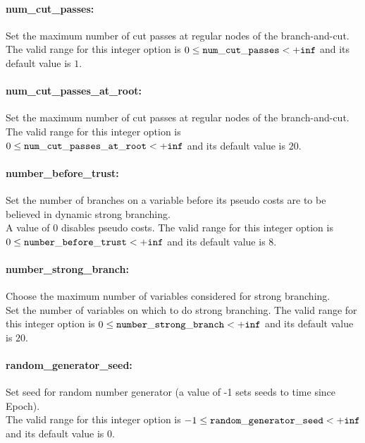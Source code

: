 \paragraph{num\_cut\_passes:}\label{sec:num_cut_passes} Set the maximum number of cut passes at regular nodes of the branch-and-cut. $\;$ \\
 The valid range for this integer option is
$0 \le {\tt num\_cut\_passes } <  {\tt +inf}$
and its default value is $1$.


\paragraph{num\_cut\_passes\_at\_root:}\label{sec:num_cut_passes_at_root} Set the maximum number of cut passes at regular nodes of the branch-and-cut. $\;$ \\
 The valid range for this integer option is
$0 \le {\tt num\_cut\_passes\_at\_root } <  {\tt +inf}$
and its default value is $20$.


\paragraph{number\_before\_trust:}\label{sec:number_before_trust} Set the number of branches on a variable before its pseudo costs are to be believed in dynamic strong branching. $\;$ \\
 A value of 0 disables pseudo costs. The valid range for this integer option is
$0 \le {\tt number\_before\_trust } <  {\tt +inf}$
and its default value is $8$.


\paragraph{number\_strong\_branch:}\label{sec:number_strong_branch} Choose the maximum number of variables considered for strong branching. $\;$ \\
 Set the number of variables on which to do strong
branching. The valid range for this integer option is
$0 \le {\tt number\_strong\_branch } <  {\tt +inf}$
and its default value is $20$.


\paragraph{random\_generator\_seed:}\label{sec:random_generator_seed} Set seed for random number generator (a value of -1 sets seeds to time since Epoch). $\;$ \\
 The valid range for this integer option is
$-1 \le {\tt random\_generator\_seed } <  {\tt +inf}$
and its default value is $0$.


